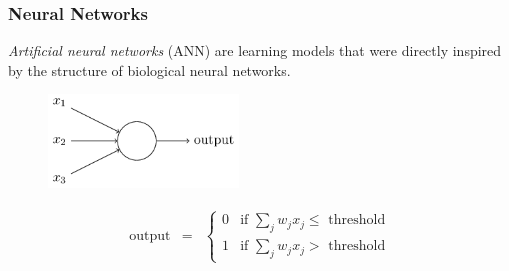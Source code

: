 \documentclass{beamer}
\begin{document}
\begin{frame}
\frametitle{Neural Networks} 

\emph{Artificial neural networks} (ANN) are learning models that were directly inspired by the structure of biological neural networks.

\begin{figure}[!h]
\begin{center}
\includegraphics[width=0.45\textwidth]{figures/tikz0.png}
\end{center}
\end{figure}

\begin{eqnarray}
  \mbox{output} & = & \left\{ \begin{array}{ll}
      0 & \mbox{if } \sum_j w_j x_j \leq \mbox{ threshold} \\
      1 & \mbox{if } \sum_j w_j x_j > \mbox{ threshold}
      \end{array} \right.
\tag{1}\end{eqnarray}




\end{frame}
\end{document}
